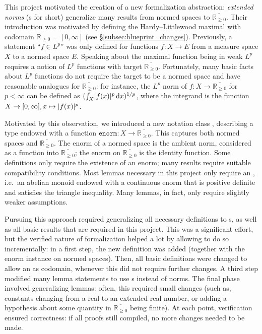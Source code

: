 \documentclass[12pt]{amsart}
\DeclarePairedDelimiter{\abs}{\lvert}{\rvert}
\newcommand*{\ud}{\, \mathrm{d}}
\newcommand*{\real}{\mathbb{R}} %
\newcommand{\ennreal}{\overline{\real_{\ge0}}}
\theoremstyle{definition}
\theoremstyle{plain}
\begin{document}
This project motivated the creation of a new formalization abstraction: \emph{extended norms} (s for short) generalize many results from normed spaces to $\ennreal$.
Their introduction was motivated by defining the Hardy--Littlewood maximal with codomain $\ennreal=[0,\infty]$ (see \S\ref{subsec:blueprint_changes}).
Previously, a statement ``$f\in L^p$'' was only defined for functions $f\colon X\to E$ from a measure space $X$ to a normed space $E$. Speaking about the maximal function being in weak $L^p$ requires a notion of $L^p$ functions with target $\ennreal$. Fortunately, many basic facts about $L^p$ functions do not require the target to be a normed space and have reasonable analogues for $\ennreal$: for instance, the $L^p$ norm of $f\colon X\to\ennreal$ for $p<\infty$ can be defined as $(\int_X \abs{f(x)}^p \ud x)^{1/p}$, where the integrand is the function $X\to[0,\infty], x\mapsto \abs{f(x)}^p$.

Motivated by this observation, we introduced a new notation class , describing a type endowed with a function $\texttt{enorm}\colon X\to\ennreal$.
This captures both normed spaces and $\ennreal$. The enorm of a normed space is the ambient norm, considered as a function into $\ennreal$; the enorm on $\ennreal$ is the identity function.
Some definitions only require the existence of an enorm; many results require suitable compatibility conditions. %
Most lemmas necessary in this project only require an , i.e.\ an abelian monoid endowed with a continuous enorm that is positive definite and satisfies the triangle inequality. Many lemmas, in fact, only require slightly weaker assumptions. %

Pursuing this approach required generalizing all necessary definitions to s, as well as all basic results that are required in this project. This was a significant effort, but the verified nature of formalization helped a lot by allowing to do so incrementally: in a first step, the new definition was added (together with the enorm instance on normed spaces). Then, all basic definitions were changed to allow an  as codomain, whenever this did not require further changes. A third step modified many lemma statements to use s instead of norms.
The final phase involved generalizing lemmas: often, this required small changes (such as, constants changing from a real to an extended real number, or adding a hypothesis about some quantity in $\ennreal$ being finite). At each point, verification ensured correctness: if all proofs still compiled, no more changes needed to be made.
\end{document}
